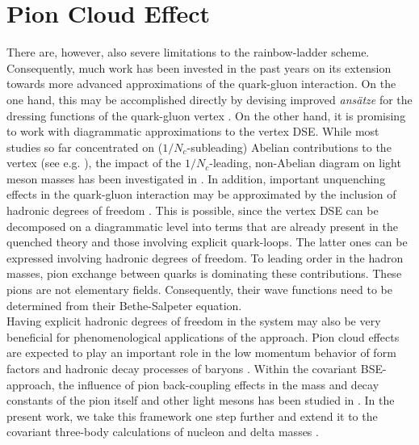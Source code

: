 \chapter{Pion Cloud Effect}
\label{chap:pion}
There are, however, also severe limitations to the 
rainbow-ladder scheme. Consequently, much work has been 
invested in the past years on its extension towards more 
advanced approximations of the quark-gluon interaction. 
On the one hand, this may be accomplished directly by devising
improved \textit{ans\"atze} for the dressing functions of the 
quark-gluon vertex 
\cite{Fischer:2005en,Chang:2009zb,Chang:2010hb,Heupel:2014ina}.
On the other hand, it is promising to work with diagrammatic
approximations to the vertex DSE. While most studies so far concentrated 
on ($1/N_c$-subleading) Abelian contributions to the vertex (see e.g. 
\cite{Bender:1996bb,Watson:2004kd,Watson:2004jq,Bhagwat:2004hn,Matevosyan:2006bk}),
the impact of the $1/N_c$-leading, non-Abelian diagram on light meson
masses has been investigated in \cite{Fischer:2009jm}. In addition,
important unquenching effects in the quark-gluon interaction may 
be approximated by the inclusion of hadronic degrees 
of freedom \cite{Fischer:2007ze,Fischer:2008sp,Fischer:2008wy}. 
This is possible, since the vertex DSE can be decomposed on a diagrammatic
level into terms that are already present in the quenched theory and those 
involving explicit quark-loops. The latter ones can be expressed involving  
hadronic degrees of freedom. To leading order in the hadron masses, pion 
exchange between quarks is dominating these contributions. These pions are 
not elementary fields. Consequently, their wave functions need to be determined 
from their Bethe-Salpeter equation. \\

Having explicit hadronic degrees of freedom in the system may also be very 
beneficial for phenomenological applications of the approach. Pion cloud effects 
are expected to play an important role in the low momentum behavior of 
form factors and hadronic decay processes of baryons
\cite{Thomas:1981vc,Miller:2002ig,Ramalho:2008dp,Cloet:2012cy,Eichmann:2011vu,
Eichmann:2011aa,Sanchis-Alepuz:2013iia}. Within the covariant BSE-approach, 
the influence of pion back-coupling effects in the mass and decay 
constants of the pion itself and other light mesons has been studied in \cite{Fischer:2008wy}. 
In the present work, we take this framework one step further and extend it 
to the covariant three-body calculations of nucleon and delta masses 
\cite{Eichmann:2009qa,Eichmann:2009en,SanchisAlepuz:2011jn}. 

